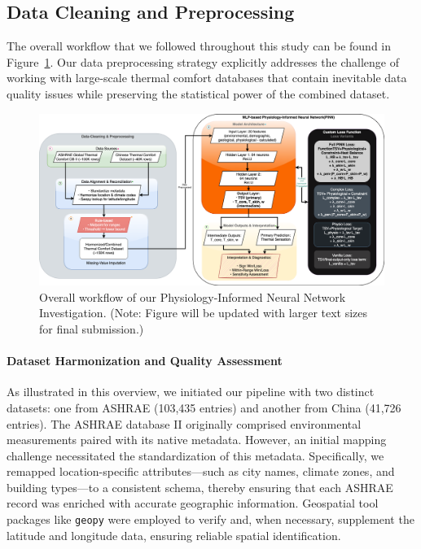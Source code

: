 \subsection{Data Cleaning and Preprocessing}

The overall workflow that we followed throughout this study can be found in Figure~\ref{fig:journey-roadmap}. Our data preprocessing strategy explicitly addresses the challenge of working with large-scale thermal comfort databases that contain inevitable data quality issues while preserving the statistical power of the combined dataset.

\begin{figure}
    \centering
    \includegraphics[width=0.95\linewidth]{figures/PINN_noVAE.png}
    \caption{Overall workflow of our Physiology-Informed Neural Network Investigation. (Note: Figure will be updated with larger text sizes for final submission.)}
    \label{fig:journey-roadmap}
\end{figure}

\paragraph{Dataset Harmonization and Quality Assessment} As illustrated in this overview, we initiated our pipeline with two distinct datasets: one from ASHRAE (103,435 entries) and another from China (41,726 entries). The ASHRAE database II originally comprised environmental measurements paired with its native metadata. However, an initial mapping challenge necessitated the standardization of this metadata. Specifically, we remapped location-specific attributes—such as city names, climate zones, and building types—to a consistent schema, thereby ensuring that each ASHRAE record was enriched with accurate geographic information. Geospatial tool packages like \texttt{geopy} were employed to verify and, when necessary, supplement the latitude and longitude data, ensuring reliable spatial identification. 

